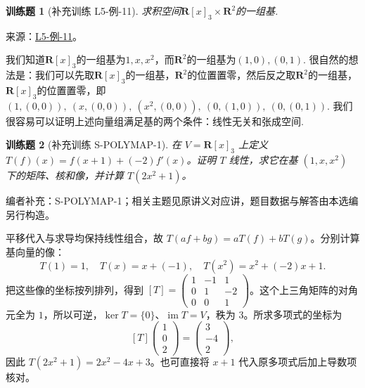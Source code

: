 \documentclass[12pt,fontset=fandol]{ctexart}
\newtheorem{exercise}{训练题}[section]
\begin{document}
\begin{exercise}[补充训练 L5-例-11]\label{prob:L5-例-11}
求积空间$\mathbf{R}[x]_3\times\mathbf{R}^2$的一组基.
\end{exercise}
\noindent 来源：\href{https://github.com/yhwu-is/Linear-Algebra-Left-Undone/blob/new/%E8%AE%B2%E4%B9%89/%E4%B8%93%E9%A2%98/5%20%E7%BA%BF%E6%80%A7%E6%98%A0%E5%B0%84.tex}{L5-例-11}。
\begin{solve}
我们知道$\mathbf{R}[x]_3$的一组基为$1,x,x^2$，而$\mathbf{R}^2$的一组基为$(1,0),(0,1)$. 很自然的想法是：我们可以先取$\mathbf{R}[x]_3$的一组基，$\mathbf{R}^2$的位置置零，然后反之取$\mathbf{R}^2$的一组基，$\mathbf{R}[x]_3$的位置置零，即$(1,(0,0)),\ (x,(0,0)),\ (x^2,(0,0)),\ (0,(1,0)),\ (0,(0,1))$. 我们很容易可以证明上述向量组满足基的两个条件：线性无关和张成空间.
\end{solve}

\begin{exercise}[补充训练 S-POLYMAP-1]\label{prob:S-POLYMAP-1}
在 $V=\mathbf R[x]_3$ 上定义 $T(f)(x)=f(x+1)+(-2)f'(x)$。证明 $T$ 线性，求它在基 $(1,x,x^2)$ 下的矩阵、核和像，并计算 $T(2x^{2}+1)$。
\end{exercise}
\noindent 编者补充：S-POLYMAP-1；相关主题见原讲义对应讲，题目数据与解答由本选编另行构造。
\begin{solve}
平移代入与求导均保持线性组合，故 $T(af+bg)=aT(f)+bT(g)$。分别计算基向量的像：
\[T(1)=1,\quad T(x)=x+(-1),\quad T(x^2)=x^2+(-2)x+1.\]
把这些像的坐标按列排列，得到 $[T]=\begin{pmatrix}1&-1&1\\0&1&-2\\0&0&1\end{pmatrix}$。这个上三角矩阵的对角元全为 $1$，所以可逆，$\ker T=\{0\}$、$\operatorname{im} T=V$，秩为 $3$。所求多项式的坐标为
\[[T]\begin{pmatrix}1\\0\\2\end{pmatrix}=\begin{pmatrix}3\\-4\\2\end{pmatrix},\]
因此 $T(2x^{2}+1)=2x^{2}-4x+3$。也可直接将 $x+1$ 代入原多项式后加上导数项核对。
\end{solve}
\end{document}
